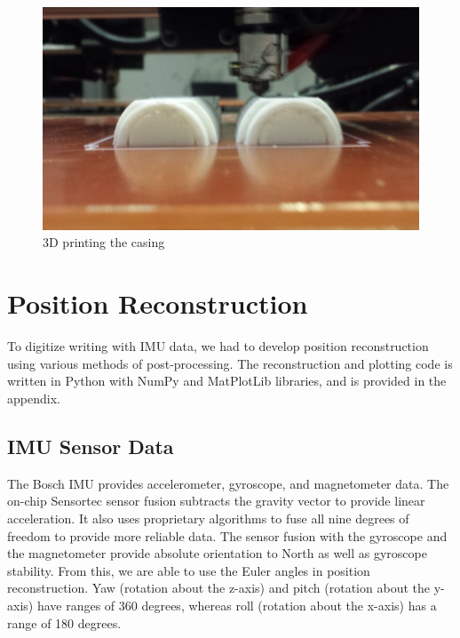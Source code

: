 \documentclass[12pt,journal]{IEEEtran}
\begin{document}
\begin{figure}[h]
  \centering
    \includegraphics[width=0.6\linewidth]{figures/3d-print}
  \caption{3D printing the casing}
  \label{fig:3d-print}
\end{figure}

\section{Position Reconstruction}
To digitize writing with IMU data, we had to develop position reconstruction using various methods of post-processing. The reconstruction and plotting code is written in Python with NumPy and MatPlotLib libraries, and is provided in the appendix.

\subsection{IMU Sensor Data}
	The Bosch IMU provides accelerometer, gyroscope, and magnetometer data. The on-chip Sensortec sensor fusion subtracts the gravity vector to provide linear acceleration. It also uses proprietary algorithms to fuse all nine degrees of freedom to provide more reliable data. The sensor fusion with the gyroscope and the magnetometer provide absolute orientation to North as well as gyroscope stability. From this, we are able to use the Euler angles in position reconstruction. Yaw (rotation about the z-axis) and pitch (rotation about the y-axis) have ranges of 360 degrees, whereas roll (rotation about the x-axis) has a range of 180 degrees.
\end{document}
